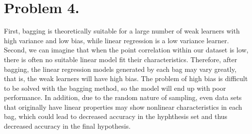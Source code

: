 \documentclass{article}
\begin{document}
    \section*{Problem 4.}
    First, bagging is theoretically suitable for a large number of weak learners with high variance and 
    low bias, while linear regression is a low variance learner. Second, we can imagine that when the point 
    correlation within our dataset is low, there is often no suitable linear model fit their characteristics.
    Therefore, after bagging, the linear regression models generated by each bag may vary greatly, that is,
    the weak learners will have high bias. The problem of high bias is difficult to be solved with the bagging 
    method, so the model will end up with poor performance. In addition, due to the random nature of sampling, 
    even data sets that originally have linear properties may show nonlinear characteristics in each bag, which
    could lead to decreased accuracy in the hyphthesis set and thus decreased accuracy in the final hypothesis.
\end{document}
